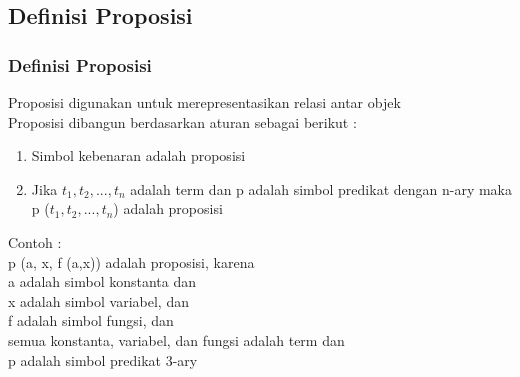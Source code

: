 \documentclass[handout]{beamer}
\theoremstyle{definition}
\theoremstyle{example}
\begin{document}
\subsection{Definisi Proposisi}
\begin{frame}
	\frametitle{Definisi Proposisi}
   Proposisi digunakan untuk merepresentasikan relasi antar objek\\
   Proposisi dibangun berdasarkan aturan sebagai berikut :\\
   \begin{enumerate} 
   	\item  Simbol kebenaran adalah proposisi
    \item  Jika $t_1, t_2, ..., t_n$ adalah term dan p adalah simbol predikat dengan n-ary maka p ($t_1,t_2, ..., t_n$) adalah proposisi
   \end{enumerate}
   Contoh :\\
   p (a, x, f (a,x)) adalah proposisi, karena\\
   a adalah simbol konstanta dan\\
   x adalah simbol variabel, dan\\
   f adalah simbol fungsi, dan\\   
   semua konstanta, variabel, dan fungsi adalah term dan\\
   p adalah simbol predikat 3-ary
\end{frame}		
\end{document}
